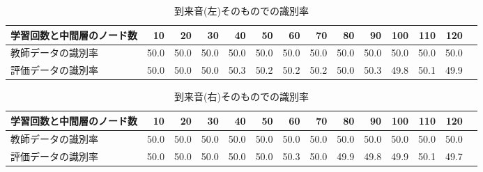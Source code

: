 \documentclass[autodetect-engine,12pt,titlepagedvi=dvipdfmx,ja=standard]{bxjsreport}
\begin{document}
     \begin{table}[!htp]\centering
      \caption{到来音(左)そのものでの識別率}\label{tab:3.4}
      \scriptsize
     \begin{tabular}{l|rrrrrrrrrrrrr}
      学習回数と中間層のノード数 &10 &20 &30 &40 &50 &60 &70 &80 &90 &100 &110 &120 \\
      \hline
      教師データの識別率 &50.0 &50.0 &50.0 &50.0 &50.0 &50.0 &50.0 &50.0 &50.0 &50.0 &50.0 &50.0 \\
      評価データの識別率 &50.0 &50.0 &50.0 &50.3 &50.2 &50.2 &50.2 &50.0 &50.3 &49.8 &50.1 &49.9 \\
      \end{tabular}
      \end{table}

      \begin{table}[!htp]\centering
        \caption{到来音(右)そのものでの識別率}\label{tab:3.5}
        \scriptsize
        \begin{tabular}{l|rrrrrrrrrrrrr}
          学習回数と中間層のノード数 &10 &20 &30 &40 &50 &60 &70 &80 &90 &100 &110 &120 \\
        \hline
        教師データの識別率 &50.0 &50.0 &50.0 &50.0 &50.0 &50.0 &50.0 &50.0 &50.0 &50.0 &50.0 &50.0 \\
        評価データの識別率 &50.0 &50.0 &50.0 &50.0 &50.0 &50.3 &50.0 &49.9 &49.8 &49.9 &50.1 &49.7 \\
        \end{tabular}
        \end{table}
  

\clearpage

\end{document}
